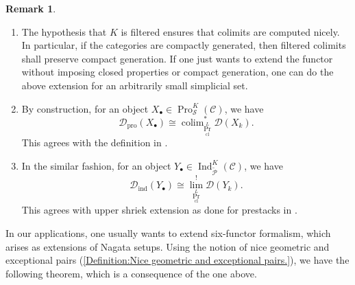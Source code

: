\documentclass[14pt]{article}
\theoremstyle{definition}
\newtheorem{remark}[theorem]{Remark}
\newcommand{\D}{\mathcal{D}}
\renewcommand{\P}{\mathcal{P}}
\newcommand{\op}[1]{\operatorname{#1}}
\renewcommand{\S}{\mathcal{S}}
\newcommand{\Ca}{\mathcal{C}}
\newcommand{\bb}{\bullet}
\numberwithin{subsection}{section}
\begin{document}
\begin{remark}
\begin{enumerate}
\item The hypothesis that $K$ is filtered ensures that colimits are computed nicely. In particular, if the categories are compactly generated, then filtered colimits shall preserve compact generation. If one just wants to extend the functor without imposing closed properties or compact generation, one can do the above extension for an arbitrarily small simplicial set. 
    \item By construction, for an object $X_{\bb} \in \op{Pro}^K_{\S}(\Ca)$, we have 
    \begin{equation}
        \D_{\op{pro}}(X_{\bb}) \cong \op{colim}_{\op{Pr}^L_{\op{cl}}}^* \D(X_k).
    \end{equation} This agrees with the definition in \cite{yaylali2025rationalmotivesproalgebraicstacks}.
    \item In the similar fashion, for an object $Y_{\bb} \in \op{Ind}^K_{\tilde{\P}}(\Ca)$, we have 
    \begin{equation}
        \D_{\op{ind}}(Y_{\bb}) \cong \op{lim}^!_{\op{Pr}^L_{\op{cl}}}\D(Y_k).
    \end{equation}
    This agrees with upper shriek extension as done for prestacks in \cite[Section 2.2]{Richarz_2021}.
\end{enumerate}
    
\end{remark}
In our applications, one usually wants to extend six-functor formalism, which arises as extensions of Nagata setups. Using the notion of nice geometric and exceptional pairs (\cref{Definition:Nice geometric and exceptional pairs.}), we have the following theorem, which is a consequence of the one above.
\end{document}
